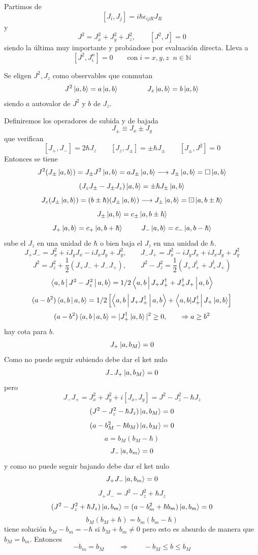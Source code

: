 \documentclass[10pt,oneside]{CBFT_book}
\begin{document}
Partimos de 
\[
	[J_i, J_j] =  i\hbar \epsilon_{ijR}J_R
\]
y
\[
	J^2 = J^2_x + J^2_y + J^2_z, \qquad  [J^2,J] = 0
\]
siendo la última muy importante y probándose por evaluación directa. Lleva a 
\[
	[J^2,J_i^n] = 0 \qquad \text{con} \; i=x,y,z \;\; n\in\mathbb{N}
\]

Se eligen $J^2, J_z$ como observables que conmutan 
\[
	J^2 \Ket{a,b} = a\Ket{a,b} \qquad \qquad J_z \Ket{a,b} = b\Ket{a,b}
\]
siendo $a$ autovalor de $J^2$ y $b$ de $J_z$.

Definiremos los operadores de subida y de bajada
\[
	J_{\pm} \equiv J_x \pm J_y
\]
que verifican 
\[
	[ J_+, J_- ] = 2\hbar J_z \qquad [ J_z, J_\pm]= \pm \hbar J_{\pm} \qquad [J_{\pm}, J^2 ] = 0
\]
Entonces se tiene 
\[
	J^2( J_\pm \Ket{a,b}) = J_\pm J^2 \Ket{a,b} = a J_\pm \Ket{a,b} \longrightarrow 
		J_\pm \Ket{a,b} = \Box \Ket{a,b}
\]
\[
	(J_zJ_\pm - J_\pm J_z) \Ket{a,b} = \pm\hbar J_\pm \Ket{a,b}
\]
\[
	J_z (J_\pm \Ket{a,b}) = (b\pm\hbar)(J_\pm \Ket{a,b}) \longrightarrow 
		J_\pm \Ket{a,b} = \boxdot \Ket{a,b\pm\hbar}
\]
\[
	J_{\pm} \Ket{a,b} = c_{\pm} \Ket{a,b\pm\hbar}
\]
\[
	J_+\Ket{a,b} = c_+\Ket{a,b+\hbar} \;\qquad\; J_-\Ket{a,b} =  c_- \Ket{a,b-\hbar}
\]
sube el $J_z$ en una unidad de $\hbar$ o bien baja el $J_z$ en una unidad de $\hbar$.
\[
	J_+J_- = J_x^2 + iJ_yJ_x - iJ_xJ_y + J_y^2 , \qquad J_-J_+ = J_x^2 - iJ_yJ_x + iJ_xJ_y + J_y^2
\]
\[
	J^2 = J_z^2 + \frac{1}{2}(J_+J_- + J_-J_+ ) , \qquad 
		J^2 - J_z^2 = \frac{1}{2}(J_+J_+^\dagger + J_+^\dagger J_+ )
\]
\[
	\Braket{a,b|J^2 - J^2_z|a,b} =  1/2 \Braket{a,b|J_+J_+^\dagger + J_+^\dagger J_+|a,b}
\]
\[
	(a-b^2)\Braket{a,b|a,b} = 1/2 \left[ \Braket{a,b|J_+J_+^\dagger|a,b} + 
		\Bra{a,b|J_+^\dagger} J_+\Ket{a,b} \right] 
\]
\[
	(a-b^2)\Braket{a,b|a,b} = |J_+^\dagger\Ket{a,b}|^2 \geq 0, \qquad \Rightarrow a \geq b^2
\]
hay cota para $b$.
\[
	J_+ \Ket{a,b_M} = 0
\]
Como no puede seguir subiendo debe dar el ket nulo 
\[
	J_-J_+ \Ket{a,b_M} = 0
\]
pero
\[
	J_-J_+ = J^2_x + J^2_y + i[J_x, J_y]  = J^2 - J^2_z - \hbar J_z
\]
\[
	( J^2 - J^2_z  -\hbar J_z) \Ket{a,b_M}  = 0	
\]
\[
	( a - b_M^2 - \hbar b_M ) \Ket{a,b_M}  = 0	
\]
\[
	a = b_M ( b_M -\hbar )
\]
\[
	J_- \Ket{a,b_m} = 0
\]
y como no puede seguir bajando debe dar el ket nulo
\[
	J_+J_- \Ket{a,b_m} = 0
\]
\[
	J_+J_- =  J^2 - J^2_z + \hbar J_z
\]
\[
	( J^2 - J^2_z + \hbar J_z) \Ket{a,b_m} = ( a - b_m^2 + \hbar b_m) \Ket{a,b_m} = 0
\]
\[
	b_M( b_M + \hbar ) = b_m( b_m -\hbar )
\]
tiene solución $b_M-b_m = -\hbar$ si $b_M + b_m \neq 0$ 
pero esto es absurdo de manera que $b_M = b_m$.
Entonces
\[
	-b_m = b_M  \qquad \Rightarrow \qquad -b_M \leq b \leq b_M
\]
\end{document}
